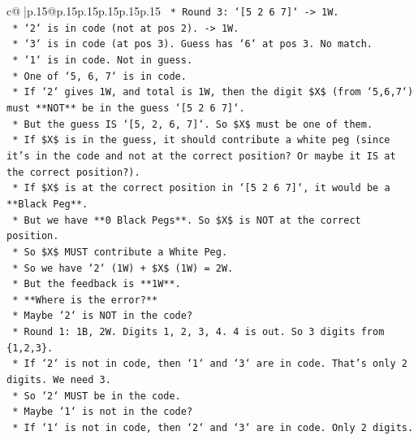\documentclass{article}
\begin{document}
{\begin{supertabular}{c@{$\;$}|p{.15\linewidth}@{}p{.15\linewidth}p{.15\linewidth}p{.15\linewidth}p{.15\linewidth}p{.15\linewidth}}
{{{\texttt{                *   Round 3: `{[}5 2 6 7{]}` {-}> 1W.} \\
\texttt{                    *   `2` is in code (not at pos 2). {-}> 1W.} \\
\texttt{                    *   `3` is in code (at pos 3). Guess has `6` at pos 3. No match.} \\
\texttt{                    *   `1` is in code. Not in guess.} \\
\texttt{                    *   One of `5, 6, 7` is in code.} \\
\texttt{                    *   If `2` gives 1W, and total is 1W, then the digit \$X\$ (from `5,6,7`) must **NOT** be in the guess `{[}5 2 6 7{]}`.} \\
\texttt{                    *   But the guess IS `{[}5, 2, 6, 7{]}`. So \$X\$ must be one of them.} \\
\texttt{                    *   If \$X\$ is in the guess, it should contribute a white peg (since it's in the code and not at the correct position? Or maybe it IS at the correct position?).} \\
\texttt{                    *   If \$X\$ is at the correct position in `{[}5 2 6 7{]}`, it would be a **Black Peg**.} \\
\texttt{                    *   But we have **0 Black Pegs**. So \$X\$ is NOT at the correct position.} \\
\texttt{                    *   So \$X\$ MUST contribute a White Peg.} \\
\texttt{                    *   So we have `2` (1W) + \$X\$ (1W) = 2W.} \\
\texttt{                    *   But the feedback is **1W**.} \\
\texttt{                    *   **Where is the error?**} \\
\texttt{                    *   Maybe `2` is NOT in the code?} \\
\texttt{                        *   Round 1: 1B, 2W. Digits 1, 2, 3, 4. 4 is out. So 3 digits from \{1,2,3\}.} \\
\texttt{                        *   If `2` is not in code, then `1` and `3` are in code. That's only 2 digits. We need 3.} \\
\texttt{                        *   So `2` MUST be in the code.} \\
\texttt{                    *   Maybe `1` is not in the code?} \\
\texttt{                        *   If `1` is not in code, then `2` and `3` are in code. Only 2 digits.} \\
}}}
\end{supertabular}}
\end{document}
